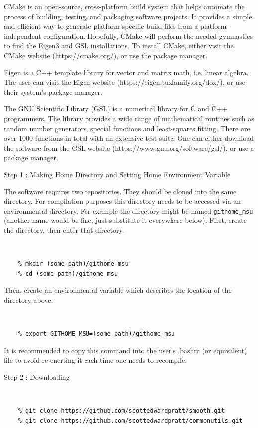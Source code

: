 \documentclass[12pt]{article}
\numberwithin{equation}{section}
\numberwithin{figure}{section}
\begin{document}
CMake is an open-source, cross-platform build system that helps automate the process of building, testing, and packaging software projects. It provides a simple and efficient way to generate platform-specific build files from a platform-independent configuration. Hopefully, CMake will perform the needed gymnastics to find the Eigen3 and GSL installations. To install CMake, either visit the CMake website (https://cmake.org/), or use the package manager.

Eigen is a C++ template library for vector and matrix math, i.e. linear algebra. The user can visit the Eigen website (https://eigen.tuxfamily.org/dox/), or use their system's package manager.

The GNU Scientific Library (GSL) is a numerical library for C and C++ programmers. The library provides a wide range of mathematical routines such as random number generators, special functions and least-squares fitting. There are over 1000 functions in total with an extensive test suite. One can either download the software from the GSL website (https://www.gnu.org/software/gsl/), or use a package manager.



\begin{description}
\item[Step 1 : Making Home Directory and Setting Home Environment Variable]
\end{description}

The software requires two repositories. They should be cloned into the same directory. For compilation purposes this directory needs to be accessed via an environmental directory.  For example the directory might be named {\tt githome\_msu} (another name would be fine, just substitute it everywhere below). First, create the directory, then enter that directory.
{\tt 
\begin{verbatim}
    % mkdir (some path)/githome_msu
    % cd (some path)/githome_msu
\end{verbatim}
}
Then, create an environmental variable which describes the location of the directory above. 

{\tt 
\begin{verbatim}
    % export GITHOME_MSU=(some path)/githome_msu
\end{verbatim}
}
It is recommended to copy this command into the user's .bashrc (or equivalent) file to avoid re-enerting it each time one needs to recompile.

\begin{description}
\item[Step 2 : Downloading] 
\end{description}
{\tt 
\begin{verbatim}
    % git clone https://github.com/scottedwardpratt/smooth.git
    % git clone https://github.com/scottedwardpratt/commonutils.git
\end{verbatim}
}
\end{document}
